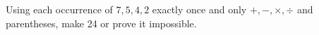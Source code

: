 Using each occurrence of $7,5,4,2$ exactly once and only $+,-,\times,\div$ and parentheses, make 24 or prove it impossible.
